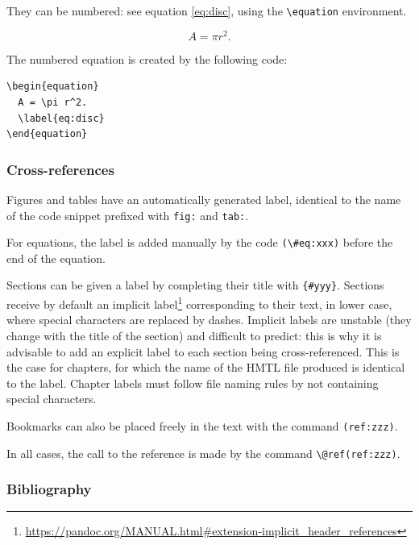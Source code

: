 \documentclass[
  12pt,
  american,
  a4paper,
  extrafontsizes,onecolumn,openright
  ]{memoir}
\begin{document}
They can be numbered: see equation \eqref{eq:disc}, using the \texttt{\textbackslash{}equation} environment.

\begin{equation}
  A = \pi r^2.
  \label{eq:disc}
\end{equation}

The numbered equation is created by the following code:

\begin{verbatim}
\begin{equation}
  A = \pi r^2.
  \label{eq:disc}
\end{equation}
\end{verbatim}

\hypertarget{cross-references}{%
\subsubsection{Cross-references}\label{cross-references}}

Figures and tables have an automatically generated label, identical to the name of the code snippet prefixed with \texttt{fig:} and \texttt{tab:}.

For equations, the label is added manually by the code \texttt{(\textbackslash{}\#eq:xxx)} before the end of the equation.

Sections can be given a label by completing their title with \texttt{\{\#yyy\}}.
Sections receive by default an implicit label\footnote{\url{https://pandoc.org/MANUAL.html\#extension-implicit_header_references}} corresponding to their text, in lower case, where special characters are replaced by dashes.
Implicit labels are unstable (they change with the title of the section) and difficult to predict: this is why it is advisable to add an explicit label to each section being cross-referenced.
This is the case for chapters, for which the name of the HMTL file produced is identical to the label.
Chapter labels must follow file naming rules by not containing special characters.

Bookmarks can also be placed freely in the text with the command \texttt{(ref:zzz)}.

In all cases, the call to the reference is made by the command \texttt{\textbackslash{}@ref(ref:zzz)}.

\hypertarget{bibliography}{%
\subsubsection{Bibliography}\label{bibliography}}
\end{document}
